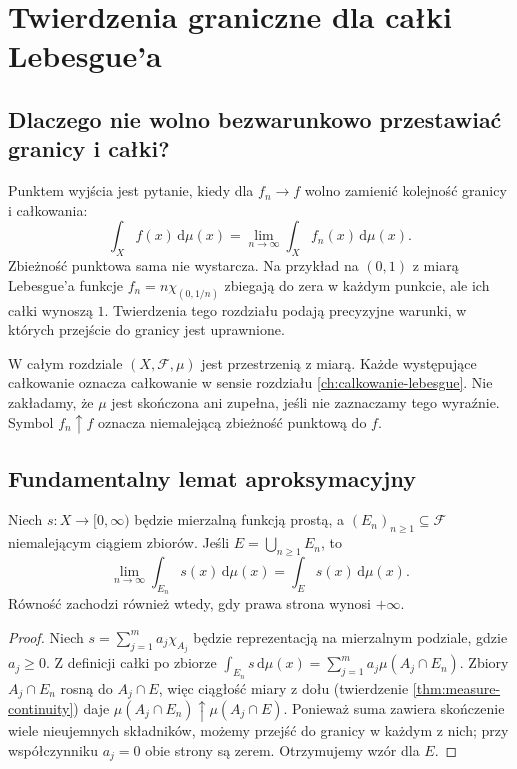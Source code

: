 \chapter{Twierdzenia graniczne dla całki Lebesgue'a}
\label{ch:twierdzenia-graniczne}

\providecommand{\atlasref}[2]{#2}


\section{Dlaczego nie wolno bezwarunkowo przestawiać granicy i całki?}

Punktem wyjścia jest pytanie, kiedy dla $f_n\to f$ wolno
zamienić kolejność granicy i całkowania:
\[
\int_X f(x)\,\mathrm d\mu(x)
=\lim_{n\to\infty}\int_X f_n(x)\,\mathrm d\mu(x).
\]
Zbieżność punktowa sama nie wystarcza. Na przykład na
$(0,1)$ z miarą Lebesgue'a funkcje
$f_n=n\chi_{(0,1/n)}$ zbiegają do zera w każdym
punkcie, ale ich całki wynoszą $1$.
Twierdzenia tego rozdziału podają precyzyjne warunki,
w których przejście do granicy jest uprawnione.

W całym rozdziale $(X,\mathcal F,\mu)$ jest przestrzenią
z miarą. Każde występujące całkowanie oznacza całkowanie
w sensie rozdziału \ref{ch:calkowanie-lebesgue}.
Nie zakładamy, że $\mu$ jest skończona ani zupełna,
jeśli nie zaznaczamy tego wyraźnie. Symbol $f_n\uparrow f$
oznacza niemalejącą zbieżność punktową do $f$.

\section{Fundamentalny lemat aproksymacyjny}

\begin{lemat}
\label{lem:simple-exhaustion}
Niech $s:X\to[0,\infty)$ będzie mierzalną funkcją
prostą, a $(E_n)_{n\ge1}\subseteq\mathcal F$
niemalejącym ciągiem zbiorów. Jeśli
$E=\bigcup_{n\ge1}E_n$, to
\[
\lim_{n\to\infty}\int_{E_n}s(x)\,\mathrm d\mu(x)
=\int_Es(x)\,\mathrm d\mu(x).
\]
Równość zachodzi również wtedy, gdy prawa strona
wynosi $+\infty$.
\end{lemat}
\begin{proof}
Niech $s=\sum_{j=1}^m a_j\chi_{A_j}$
będzie reprezentacją na mierzalnym podziale, gdzie
$a_j\ge0$. Z definicji całki po zbiorze
$\int_{E_n}s\,\mathrm d\mu(x)=
\sum_{j=1}^m a_j\mu(A_j\cap E_n)$.
Zbiory $A_j\cap E_n$ rosną do $A_j\cap E$, więc
ciągłość miary z dołu (twierdzenie
\ref{thm:measure-continuity}) daje
$\mu(A_j\cap E_n)\uparrow\mu(A_j\cap E)$.
Ponieważ suma zawiera skończenie wiele nieujemnych
składników, możemy przejść do granicy w każdym z nich;
przy współczynniku $a_j=0$ obie strony są zerem.
Otrzymujemy wzór dla $E$.
\end{proof}

